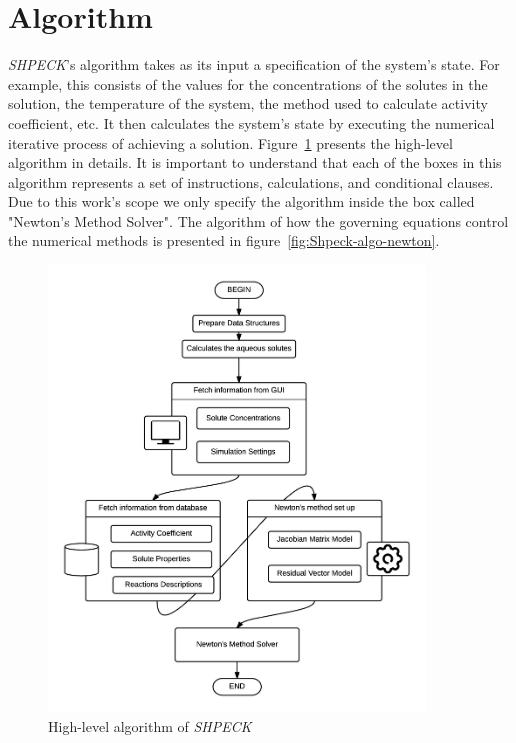 \section{Algorithm}

\emph{SHPECK}'s algorithm takes as its input a specification of the system's state. For example, this consists of the values for the concentrations of the solutes in the solution, the temperature of the system, the method used to calculate activity coefficient, etc. It then calculates the system's state by executing the numerical iterative process of achieving a solution. 
Figure~\ref{fig:Shpeck-algo} presents the high-level algorithm in details. It is important to understand that each of the boxes in this algorithm represents a set of instructions, calculations, and conditional clauses. Due to this work's scope we only specify the algorithm inside the box called "Newton's Method Solver". The algorithm of how the governing equations control the numerical methods is presented in figure~\ref{fig:Shpeck-algo-newton}. 
\begin{figure}[ht!]
\centering
\includegraphics[width=100mm]{figures/Shpeck_algo3.png}
\caption{High-level algorithm of \emph{SHPECK}}
\label{fig:Shpeck-algo}
\end{figure}
